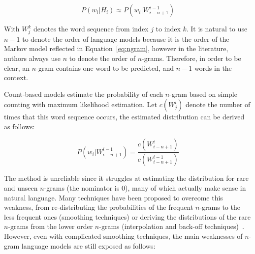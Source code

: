 \begin{equation}
P(w_i|H_i) \approx P(w_i | W_{i-n+1}^{i-1}) 
\label{eq:ngram}
\end{equation}

With $W_j^k$ denotes the word sequence from index $j$ to index $k$. It is natural to use $n-1$ to denote the order of language models because it is the order of the Markov model reflected in Equation~\ref{eq:ngram}, however in the literature, authors always use $n$ to denote the order of $n$-grams. Therefore, in order to be clear, an $n$-gram contains one word to be predicted, and $n-1$ words in the context. 

Count-based models estimate the probability of each $n$-gram based on simple counting with maximum likelihood estimation. Let $c(W_j^i)$ denote the number of times that this word sequence occurs, the estimated distribution can be derived as follows:

\begin{equation}
P(w_i | W_{i-n+1}^{i-1}) = \frac{c(W_{i-n+1}^{i})}{c(W_{i-n+1}^{i-1})}
\label{eq:ngram2}
\end{equation}

The method is unreliable since it struggles at estimating the distribution for rare and unseen $n$-grams (the nominator is 0), many of which actually make sense in natural language. Many techniques have been proposed to overcome this weakness, from re-distributing the probabilities of the frequent $n$-grams to the less frequent ones (smoothing techniques) or deriving the distributions of the rare $n$-grams from the lower order $n$-grams (interpolation and back-off techniques)~\cite{kneser1995improved,chen1999empirical,heafield2011kenlm,federico2008irstlm,ney1994structuring,witten1991zero}. However, even with complicated smoothing techniques, the main weaknesses of $n$-gram language models are still exposed as follows:

